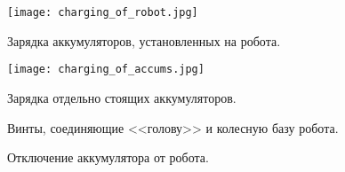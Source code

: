 \begin{figure}[h!]
    \centering
    \texttt{[image: charging\_of\_robot.jpg]}
    \caption{Зарядка аккумуляторов, установленных на робота.}
	\label{img_charging_of_robot}
\end{figure}

\begin{figure}[h!]
	\centering
	\texttt{[image: charging\_of\_accums.jpg]}
	\caption{Зарядка отдельно стоящих аккумуляторов.}
	\label{img_charging_of_batteries}
\end{figure}

\begin{figure}[p]
	\begin{minipage}[h]{0.55\linewidth}
	\end{minipage}
	\hfill
	\begin{minipage}[h]{0.44\linewidth}
	\end{minipage}
	\caption{Винты, соединяющие <<голову>> и колесную базу робота.}
	\label{img_remove_head}
\end{figure}

\begin{figure}[p]
	\begin{minipage}[h]{0.49\linewidth}
	\end{minipage}
	\hfill
	\begin{minipage}[h]{0.49\linewidth}
	\end{minipage}
	\caption{Отключение аккумулятора от робота.}
	\label{img_remove_accum}
\end{figure}